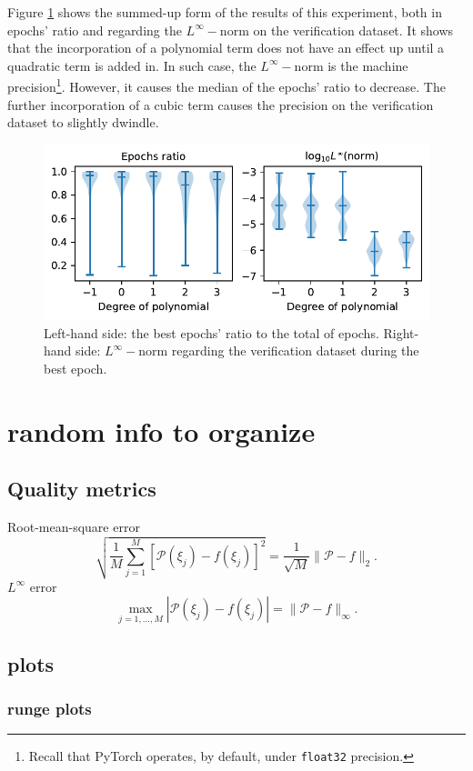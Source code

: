 \documentclass[12pt]{report} %
\begin{document}
Figure \ref{fig:ode-1d-violins} shows the summed-up form of the results of this experiment, both in epochs' ratio and regarding the $L^\infty-$norm on the verification dataset. It shows that the incorporation of a polynomial term does not have an effect up until a quadratic term is added in. In such case, the $L^\infty-$norm is the machine precision\footnote{Recall that PyTorch operates, by default, under \texttt{float32} precision.}. However, it causes the median of the epochs' ratio to decrease. The further incorporation of a cubic term causes the precision on the verification dataset to slightly dwindle.

\begin{figure}[ht]
  \includegraphics[width=.75\textwidth]{imagenes/experiments/1d/ode/violins.pdf}
  \caption{Left-hand side: the best epochs' ratio to the total of epochs. Right-hand side: $L^\infty-$norm
    regarding the verification dataset during the best epoch.}
  \label{fig:ode-1d-violins}
\end{figure}


\chapter{random info to organize}
\section{Quality metrics}

Root-mean-square error
\[ \sqrt{\frac{1}{M} \sum_{j = 1}^M [\mathcal{P} (\xi_j) - f (\xi_j)]^2} =
  \frac{1}{\sqrt{M}} \| \mathcal{P}- f \|_2 . \]
$L^{\infty}$ error
\[ \max_{j = 1, \ldots, M} | \mathcal{P} (\xi_j) - f (\xi_j) | = \|
  \mathcal{P}- f \|_{\infty} . \]
  

\section{plots}
\subsection{runge plots}
\end{document}
